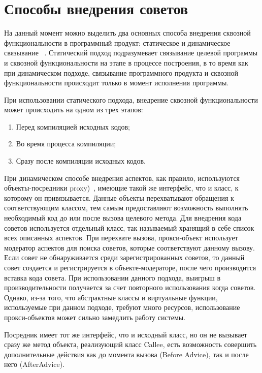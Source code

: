 \section{Способы внедрения советов}
\label{sec:aspect_weaving}
На данный момент можно выделить два основных способа внедрения сквозной
функциональности в программный продукт: статическое и динамическое связывание~
\cite{static_and_dynamic_AOP}.
Статический подход подразумевает связывание целевой программы и сквозной
функциональности на этапе в процессе построения, в то время как при динамическом
подходе, связывание программного продукта и сквозной функциональности происходит
только в момент исполнения программы.

При использовании статического подхода, внедрение сквозной функциональности
может происходить на одном из трех этапов:
\begin{enumerate}
  \item Перед компиляцией исходных кодов;
  \item Во время процесса компиляции;
  \item Сразу после компиляции исходных кодов.
\end{enumerate}

При динамическом способе внедрения аспектов, как правило, используются
объекты-посредники proxy)~\cite{aspect_dynamic_weavers}, имеющие такой же
интерфейс, что и класс, к которому он привязывается.
Данные объекты перехватывают обращения к соответствующим классом, тем самым
предоставляют возможность выполнять необходимый код до или после вызова целевого
метода.
Для внедрения кода советов используется отдельный класс, так называемый
 хранящий в себе список всех описанных аспектов.
При перехвате вызова, прокси-объект использует модератор аспектов для поиска
советов, которые соответствуют данному вызову.
Если совет не обнаруживается среди зарегистрированных советов, то данный совет
создается и регистрируется в объекте-модераторе, после чего производится вставка
кода совета.
При использовании данного подхода, выигрыш в производительности получается за
счет повторного использования когда советов.
Однако, из-за того, что абстрактные классы и виртуальные функции, используемые
при данном подходе, требуют много ресурсов, использование прокси-объектов может
сильно замедлить работу системы.

Посредник имеет тот же интерфейс, что и исходный класс, но он не вызывает 
сразу же метод объекта, реализующий класс Callee, есть возможность 
совершить дополнительные действия как до момента вызова (Before Advice), 
так и после него (AfterAdvice).

